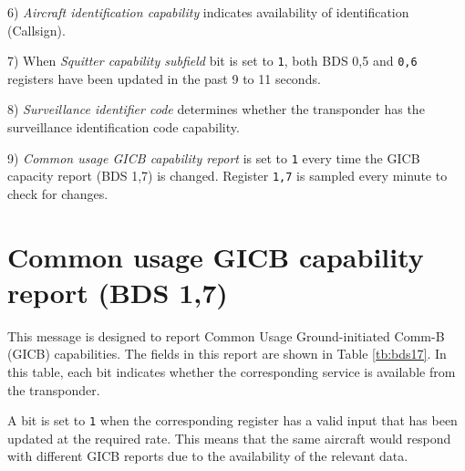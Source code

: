 6) \emph{Aircraft identification capability} indicates availability of identification (Callsign).

7) When \emph{Squitter capability subfield} bit is set to \texttt{1}, both BDS 0,5 and \texttt{0,6} registers have been updated in the past 9 to 11 seconds.

8) \emph{Surveillance identifier code} determines whether the transponder has the surveillance identification code capability.

9) \emph{Common usage GICB capability report} is set to \texttt{1} every time the GICB capacity report (BDS 1,7) is changed. Register \texttt{1,7} is sampled every minute to check for changes.

\section{Common usage GICB capability report (BDS 1,7)}

This message is designed to report Common Usage Ground-initiated Comm-B (GICB) capabilities. The fields in this report are shown in Table \ref{tb:bds17}. In this table, each bit indicates whether the corresponding service is available from the transponder. 

A bit is set to \texttt{1} when the corresponding register has a valid input that has been updated at the required rate. This means that the same aircraft would respond with different GICB reports due to the availability of the relevant data.

